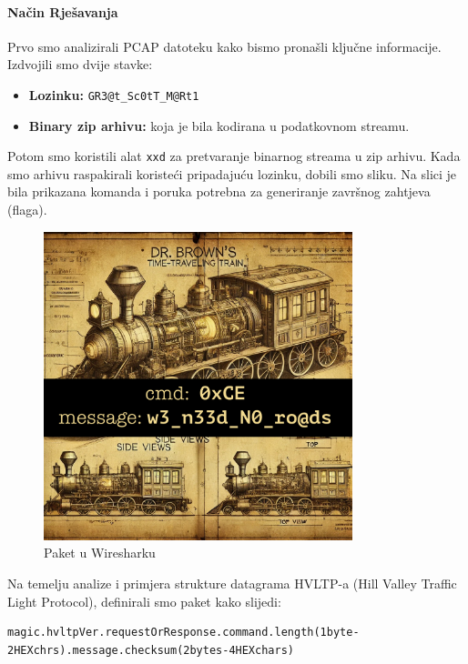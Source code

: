 \documentclass{article}
\begin{document}
\paragraph{Način Rješavanja}
Prvo smo analizirali PCAP datoteku kako bismo pronašli ključne informacije. Izdvojili smo dvije stavke:
\begin{itemize}
    \item \textbf{Lozinku:} \texttt{GR3@t\_Sc0tT\_M@Rt1}
    \item \textbf{Binary zip arhivu:} koja je bila kodirana u podatkovnom streamu.
\end{itemize}

Potom smo koristili alat \texttt{xxd} za pretvaranje binarnog streama u zip arhivu. Kada smo arhivu raspakirali koristeći pripadajuću lozinku, dobili smo sliku. Na slici je bila prikazana komanda i poruka potrebna za generiranje završnog zahtjeva (flaga).

\begin{figure}[H]
    \centering
    \includegraphics[width=0.8\textwidth]{tlcp_firmware.png}
    \caption{Paket u Wiresharku}
    \label{fig:lights_out}
\end{figure}

Na temelju analize i primjera strukture datagrama HVLTP-a (Hill Valley Traffic Light Protocol), definirali smo paket kako slijedi:
\begin{verbatim}
magic.hvltpVer.requestOrResponse.command.length(1byte-2HEXchrs).message.checksum(2bytes-4HEXchars)
\end{verbatim}
\end{document}
